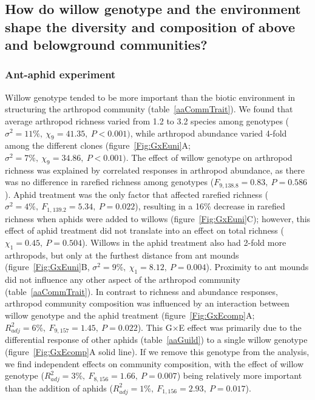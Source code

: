 \documentclass[11pt]{article}
\begin{document}
\subsection*{How do willow genotype and the environment shape the diversity and composition of above and belowground communities?}

\subsubsection*{Ant-aphid experiment}

Willow genotype tended to be more important than the biotic environment
in structuring the arthropod community (table~\ref{aaCommTrait}). We found that average arthropod richness varied from 1.2 to 3.2
species among genotypes (\(\sigma^2=11\%,\ \chi_9=41.35,\ P<0.001)\), while arthropod abundance
varied 4-fold among the different clones (figure~\ref{Fig:GxEuni}A; \(\sigma^2=7\%,\ \chi_9=34.86,\ P<0.001)\).
The effect of willow genotype on arthropod richness was explained by
correlated responses in arthropod abundance, as there was no difference
in rarefied richness among genotypes (\(F_{9,138.8}=0.83,\ P=0.586\)). Aphid
treatment was the only factor that affected rarefied richness
(\(\)\(\sigma^2=4\%,\ F_{1,139.2}=5.34,\ P=0.022\)), resulting in a 16\% decrease in
rarefied richness when aphids were added to willows (figure~\ref{Fig:GxEuni}C); however,
this effect of aphid treatment did not translate into an effect on total
richness (\(\chi_1=0.45,\ P=0.504\)). Willows in the aphid treatment also had
2-fold more arthropods, but only at the furthest distance from ant
mounds (figure~\ref{Fig:GxEuni}B, \(\sigma^2=9\%,\ \chi_1=8.12,\ P=0.004\)). Proximity to ant mounds did not
influence any other aspect of the arthropod community (table~\ref{aaCommTrait}). In
contrast to richness and abundance responses, arthropod community
composition was influenced by an interaction between willow genotype and
the aphid treatment (figure~\ref{Fig:GxEcomp}A; \(R_{adj}^2=6\%,\ F_{9,157}=1.45,\ P=0.022\)). This
G\(\times\)E effect was primarily due to the differential
response of other aphids (table~\ref{aaGuild}) to a single willow genotype (figure~\ref{Fig:GxEcomp}A solid
line). If we remove this genotype from the analysis, we find
independent effects on community composition, with the effect of willow
genotype (\(R_{adj}^2=3\%,\ F_{8,156}=1.66,\ P=0.007\)) being relatively more important than the
addition of aphids (\(R_{adj}^2=1\%,\ F_{1,156}=2.93,\ P=0.017\)).
\end{document}

